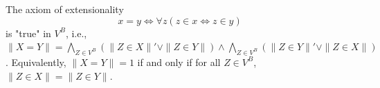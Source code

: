 The axiom of extensionality
$$x = y \Leftrightarrow \forall z (z \in x \Leftrightarrow z \in y)$$
is "true" in $V^B$, i.e., $\|X = Y\| = \bigwedge_{Z \in V^B} (\|Z \in X\|' \vee \|Z \in Y\|) \wedge \bigwedge_{Z \in V^B} (\|Z \in Y\|' \vee \|Z \in X\|)$. Equivalently, $\|X = Y\| = 1$ if and only if for all $Z \in V^B$, $\|Z \in X\| = \|Z \in Y\|$.